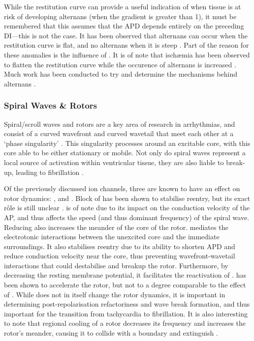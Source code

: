 \documentclass[../thesis-main.tex]{subfiles}
\begin{document}
While the restitution curve can provide a useful indication of when tissue is at risk of developing alternans (when the gradient is greater than 1), it must be remembered that this assumes that the APD depends entirely on the preceding DI---this is not the case. It has been observed that alternans can occur when the restitution curve is flat, and no alternans when it is steep \citep{Shiferaw2005}. Part of the reason for these anomalies is the influence of \cai{}. It is of note that isch\ae{}mia has been observed to flatten the restitution curve \citep{Taggart1996} while the occurence of alternans is increased \citep{Qian2001}. Much work has been conducted to try and determine the mechanisms behind \ca{} alternans \citep{Shiferaw2003, Weiss2006}.

\subsubsection{Spiral Waves \& Rotors}
\label{subsubsec:spiral-waves-rotors}
Spiral/scroll waves and rotors are a key area of research in arrhythmias, and consist of a curved wavefront and curved wavetail that meet each other at a `phase singularity' \citep{Fitzhugh1960, Fitzhugh1961, Gray1998}. This singularity processes around an excitable core, with this core able to be either stationary or mobile. Not only do spiral waves represent a local source of activation within ventricular tissue, they are also liable to break-up, leading to fibrillation \citep{Riccio1999}.

Of the previously discussed ion channels, three are known to have an effect on rotor dynamics: \ina{}, \ikix{} and \iks{}. Block of \ica{} has been shown to stabilise reentry, but its exact r\^ole is still unclear \citep{Jalife2003, Jalife2009}. \ina{} is of note due to its impact on the conduction velocity of the AP, and thus affects the speed (and thus dominant frequency) of the spiral wave. Reducing \ina{} also increases the meander of the core of the rotor. \ikix{} mediates the electrotonic interactions between the unexcited core and the immediate surroundings. It also stabilises reentry due to its ability to shorten APD and reduce conduction velocity near the core, thus preventing wavefront-wavetail interactions that could destabilise and breakup the rotor. Furthermore, by decreasing the resting membrane potential, it facilitates the reactivation of \ina{} \citep{Pandit2013}. \ikr{} has been shown to accelerate the rotor, but not to a degree comparable to the effect of \ikix{}. While \iks{} does not in itself change the rotor dynamics, it is important in determining post-repolarisation refactoriness and wave break formation, and thus important for the transition from tachycardia to fibrillation. It is also interesting to note that regional cooling of a rotor decreases its frequency and increases the rotor's meander, causing it to collide with a boundary and extinguish \citep{Yamazaki2012}.
\end{document}
